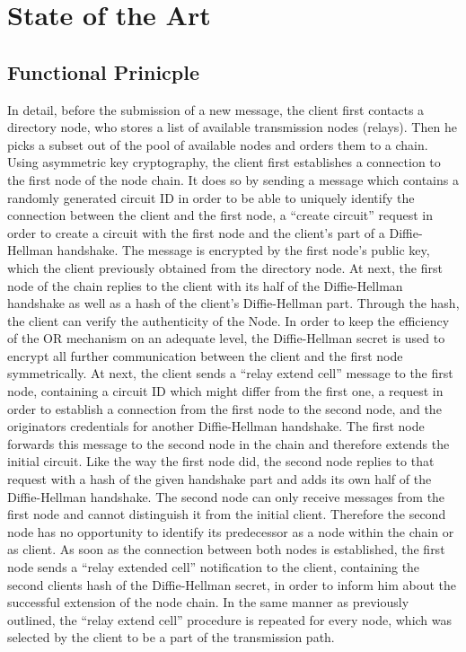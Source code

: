 \documentclass{sig-alternate}
\begin{document}
\section{State of the Art}

\subsection{Functional Prinicple}
In detail, before the submission of a new message, the client first contacts a directory node, who stores a list of available transmission nodes (relays).  Then he picks a subset out of the pool of available nodes and orders them to a chain. Using asymmetric key cryptography, the client first establishes a connection to the first node of the node chain. It does so by sending a message which contains a randomly generated circuit ID in order to be able to uniquely identify the connection between the client and the first node, a “create circuit” request in order to create a circuit with the first node and the client’s part of a Diffie-Hellman handshake. The message is encrypted by the first node’s public key, which the client previously obtained from the directory node. At next, the first node of the chain replies to the client with its half of the Diffie-Hellman handshake as well as a hash of the client’s Diffie-Hellman part. Through the hash, the client can verify the authenticity of the Node. In order to keep the efficiency of the OR mechanism on an adequate level, the Diffie-Hellman secret is used to encrypt all further communication between the client and the first node symmetrically. At next, the client sends a “relay extend cell” message to the first node, containing a circuit ID which might differ from the first one, a request in order to establish a connection from the first node to the second node, and the originators credentials for another Diffie-Hellman handshake. The first node forwards this message to the second node in the chain and therefore extends the initial circuit. Like the way the first node did, the second node replies to that request with a hash of the given handshake part and adds its own half of the Diffie-Hellman handshake. The second node can only receive messages from the first node and cannot distinguish it from the initial client. Therefore the second node has no opportunity to identify its predecessor as a node within the chain or as client. As soon as the connection between both nodes is established, the first node sends a “relay extended cell” notification to the client, containing the second clients hash of the Diffie-Hellman secret, in order to inform him about the successful extension of the node chain. In the same manner as previously outlined, the “relay extend cell” procedure is repeated for every node, which was selected by the client to be a part of the transmission path. 
\end{document}

